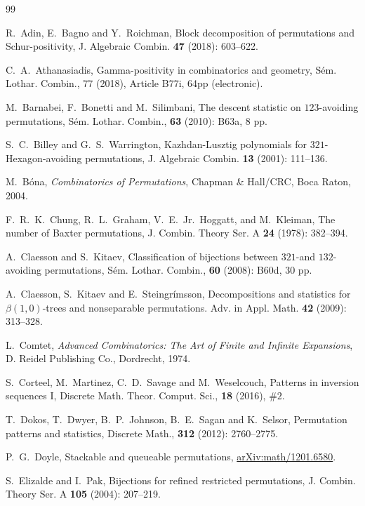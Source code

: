 \documentclass[12pt]{amsart}
\numberwithin{equation}{section}
\theoremstyle{plain}
\theoremstyle{definition}
\begin{document}
\begin{thebibliography}{99}

 R.~Adin, E.~Bagno and Y.~Roichman, Block decomposition of permutations and Schur-positivity, J. Algebraic Combin. {\bf47} (2018): 603--622.

 C.~A.~Athanasiadis, Gamma-positivity in combinatorics and geometry, S\'em. Lothar. Combin., 77 (2018), Article B77i, 64pp (electronic).

 M.~Barnabei, F.~Bonetti and M.~Silimbani, The descent statistic on $123$-avoiding permutations, S\'em. Lothar. Combin., {\bf 63} (2010): B63a, 8 pp.

 S.~C.~Billey and G.~S.~Warrington, Kazhdan-Lusztig polynomials for $321$-Hexagon-avoiding permutations, J. Algebraic Combin. {\bf13} (2001): 111--136.







 M.~B\'ona, {\em Combinatorics of Permutations}, Chapman \& Hall/CRC, Boca Raton, 2004.

 F.~R.~K.~Chung, R.~L.~Graham, V.~E.~Jr.~Hoggatt, and M.~Kleiman,
The number of Baxter permutations, J. Combin. Theory Ser. A {\bf24} (1978): 382--394. 

 A.~Claesson and S.~Kitaev, Classification of bijections between $321$-and $132$-avoiding permutations, S\'em. Lothar. Combin., {\bf 60} (2008): B60d, 30 pp.

 A.~Claesson, S.~Kitaev and E.~Steingr\'imsson,  Decompositions and statistics for $\beta(1,0)$-trees and nonseparable permutations. Adv. in Appl. Math. {\bf42} (2009): 313--328. 

 L.~Comtet, {\em Advanced Combinatorics: The Art of Finite and Infinite Expansions}, D. Reidel Publishing Co., Dordrecht, 1974.

 S.~Corteel, M.~Martinez, C.~D.~Savage and M.~Weselcouch, Patterns in inversion sequences I,  Discrete Math. Theor. Comput. Sci., {\bf18} (2016),  $\#2$.

 T.~Dokos, T.~Dwyer, B.~P.~Johnson, B.~E.~Sagan and K.~Selsor, Permutation patterns and statistics, Discrete Math., {\bf312} (2012): 2760--2775.

 P.~G.~Doyle, Stackable and queueable permutations, \href{https://arxiv.org/abs/1201.6580}{arXiv:math/1201.6580}. 

 S.~Elizalde and I.~Pak, Bijections for refined restricted permutations, J. Combin. Theory Ser. A {\bf105} (2004): 207--219.


\end{thebibliography}
\end{document}
